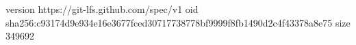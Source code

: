 version https://git-lfs.github.com/spec/v1
oid sha256:c93174d9e934e16e3677fced30717738778bf9999f8fb1490d2c4f43378a8e75
size 349692
